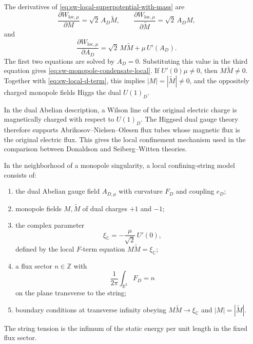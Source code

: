 The derivatives of \eqref{eq:sw-local-superpotential-with-mass} are
\[
  \frac{\partial W_{\mathrm{loc},\mu}}{\partial M}
  =
  \sqrt2\,A_D\widetilde M,\qquad
  \frac{\partial W_{\mathrm{loc},\mu}}{\partial \widetilde M}
  =
  \sqrt2\,A_D M,
\]
and
\[
  \frac{\partial W_{\mathrm{loc},\mu}}{\partial A_D}
  =
  \sqrt2\,M\widetilde M+\mu\,U'(A_D).
\]
The first two equations are solved by \(A_D=0\).  Substituting this value in
the third equation gives
\eqref{eq:sw-monopole-condensate-local}.  If \(U'(0)\mu\neq0\), then
\(M\widetilde M\neq0\).  Together with
\eqref{eq:sw-local-d-term}, this implies \(|M|=|\widetilde M|\neq0\), and the
oppositely charged monopole fields Higgs the dual \(U(1)_D\).

In the dual Abelian description, a Wilson line of the original electric
charge is magnetically charged with respect to \(U(1)_D\).  The Higgsed dual
gauge theory therefore supports Abrikosov--Nielsen--Olesen flux tubes whose
magnetic flux is the original electric flux.  This gives the local
confinement mechanism used in the comparison between Donaldson and
Seiberg--Witten theories.

\begin{definition}
\label{def:sw-local-confining-string-datum}
In the neighborhood of a monopole singularity, a local confining-string model
consists of:
\begin{enumerate}[label=(\roman*)]
\item the dual Abelian gauge field \(A_{D,\mu}\) with curvature \(F_D\) and
  coupling \(e_D\);
\item monopole fields \(M,\widetilde M\) of dual charges \(+1\) and \(-1\);
\item the complex parameter
  \begin{equation}
    \xi_{\mathbb C}=-\frac{\mu}{\sqrt2}\,U'(0),
    \label{eq:sw-complex-fi-parameter}
  \end{equation}
  defined by the local \(F\)-term equation \(M\widetilde M=\xi_{\mathbb C}\);
\item a flux sector \(n\in\mathbb Z\) with
  \[
    \frac{1}{2\pi}\int_{\mathbb R^2}F_D=n
  \]
  on the plane transverse to the string;
\item boundary conditions at transverse infinity obeying
  \(M\widetilde M\to\xi_{\mathbb C}\) and
  \(|M|=|\widetilde M|\).
\end{enumerate}
The string tension is the infimum of the static energy per unit length in the
fixed flux sector.
\end{definition}

